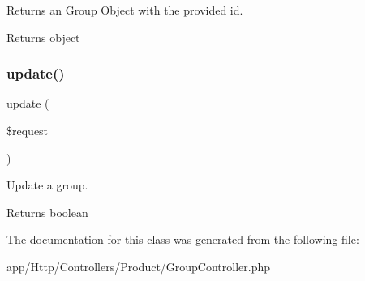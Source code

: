 Returns an Group Object with the provided id.

\begin{DoxyReturn}{Returns}
object 
\end{DoxyReturn}
\mbox{\label{class_app_1_1_http_1_1_controllers_1_1_product_1_1_group_controller_ab7b27a90191560dcef32126b0945db0d}} 
\subsubsection{\texorpdfstring{update()}{update()}}
{\footnotesize\ttfamily update (\begin{DoxyParamCaption}\item[{}]{\$request }\end{DoxyParamCaption})}

Update a group.

\begin{DoxyReturn}{Returns}
boolean 
\end{DoxyReturn}


The documentation for this class was generated from the following file\+:\begin{DoxyCompactItemize}
\item 
app/\+Http/\+Controllers/\+Product/Group\+Controller.\+php\end{DoxyCompactItemize}
